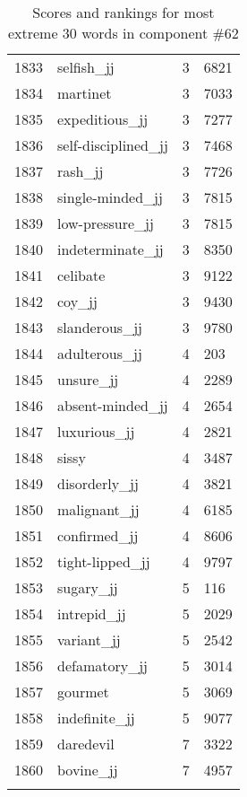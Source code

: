 \begin{longtable}[!htbp]{| rlr@{.}l |}
    1833 & selfish\_jj & 3 & 6821 \\
    1834 & martinet & 3 & 7033 \\
    1835 & expeditious\_jj & 3 & 7277 \\
    1836 & self-disciplined\_jj & 3 & 7468 \\
    1837 & rash\_jj & 3 & 7726 \\
    1838 & single-minded\_jj & 3 & 7815 \\
    1839 & low-pressure\_jj & 3 & 7815 \\
    1840 & indeterminate\_jj & 3 & 8350 \\
    1841 & celibate & 3 & 9122 \\
    1842 & coy\_jj & 3 & 9430 \\
    1843 & slanderous\_jj & 3 & 9780 \\
    1844 & adulterous\_jj & 4 & 203 \\
    1845 & unsure\_jj & 4 & 2289 \\
    1846 & absent-minded\_jj & 4 & 2654 \\
    1847 & luxurious\_jj & 4 & 2821 \\
    1848 & sissy & 4 & 3487 \\
    1849 & disorderly\_jj & 4 & 3821 \\
    1850 & malignant\_jj & 4 & 6185 \\
    1851 & confirmed\_jj & 4 & 8606 \\
    1852 & tight-lipped\_jj & 4 & 9797 \\
    1853 & sugary\_jj & 5 & 116 \\
    1854 & intrepid\_jj & 5 & 2029 \\
    1855 & variant\_jj & 5 & 2542 \\
    1856 & defamatory\_jj & 5 & 3014 \\
    1857 & gourmet & 5 & 3069 \\
    1858 & indefinite\_jj & 5 & 9077 \\
    1859 & daredevil & 7 & 3322 \\
    1860 & bovine\_jj & 7 & 4957 \\
    \hline
    \caption{Scores and rankings for most extreme 30 words in component \#62} \\
\end{longtable}

